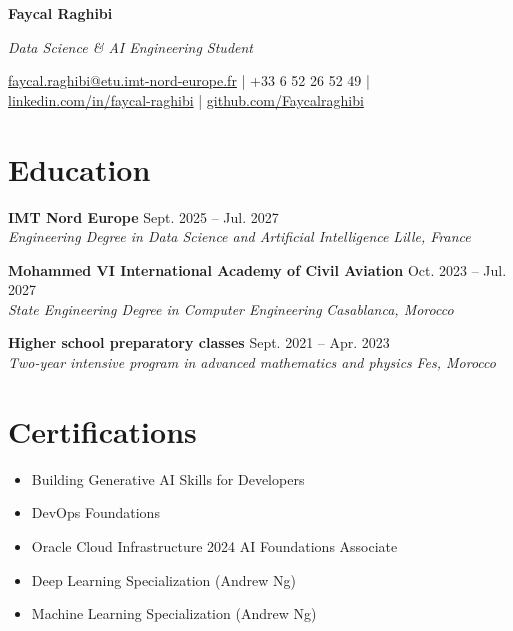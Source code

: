 \documentclass[11pt,a4paper]{article}
\newcommand{\resumeSubheading}[4]{
  \vspace{3pt}
  \noindent\textbf{#1} \hfill #2 \\
  \textit{#3} \hfill \textit{#4}
  \vspace{2pt}
}
\begin{document}
\begin{center}
{\LARGE \textbf{Faycal Raghibi}}

\vspace{2pt}
{\small\textit{Data Science \& AI Engineering Student}}

\vspace{2pt}
\href{mailto:faycal.raghibi@etu.imt-nord-europe.fr}{faycal.raghibi@etu.imt-nord-europe.fr} | +33 6 52 26 52 49 | \href{https://linkedin.com/in/faycal-raghibi}{linkedin.com/in/faycal-raghibi} | \href{https://github.com/Faycalraghibi}{github.com/Faycalraghibi}
\end{center}

\section{Education}
\resumeSubheading{IMT Nord Europe}{Sept. 2025 -- Jul. 2027}{Engineering Degree in Data Science and Artificial Intelligence}{Lille, France}
\resumeSubheading{Mohammed VI International Academy of Civil Aviation}{Oct. 2023 -- Jul. 2027}{State Engineering Degree in Computer Engineering}{Casablanca, Morocco}
\resumeSubheading{Higher school preparatory classes}{Sept. 2021 -- Apr. 2023}{Two-year intensive program in advanced mathematics and physics}{Fes, Morocco}

\section{Certifications}
\begin{itemize}
  \item Building Generative AI Skills for Developers
  \item DevOps Foundations
  \item Oracle Cloud Infrastructure 2024 AI Foundations Associate
  \item Deep Learning Specialization (Andrew Ng)
  \item Machine Learning Specialization (Andrew Ng)
\end{itemize}
\end{document}
